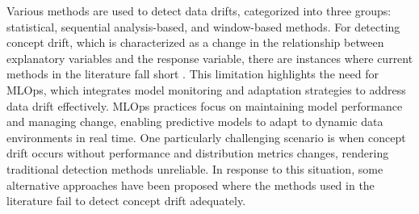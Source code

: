\documentclass[pdflatex,sn-mathphys-ay]{sn-jnl}%
\theoremstyle{thmstyleone}%
\theoremstyle{thmstyletwo}%
\theoremstyle{thmstylethree}%
\begin{document}
Various methods are used to detect data drifts, categorized into three groups: statistical, sequential analysis-based, and window-based methods. For detecting concept drift, which is characterized as a change in the relationship between explanatory variables and the response variable, there are instances where current methods in the literature fall short \citep{demvsar_and_bosnic_2018,duckworth_et_al_2021,rahmani_et_al_2023}. This limitation highlights the need for MLOps, which integrates model monitoring and adaptation strategies to address data drift effectively. MLOps practices focus on maintaining model performance and managing change, enabling predictive models to adapt to dynamic data environments in real time. One particularly challenging scenario is when concept drift occurs without performance and distribution metrics changes, rendering traditional detection methods unreliable. In response to this situation, some alternative approaches have been proposed where the methods used in the literature fail to detect concept drift adequately. 
\end{document}
